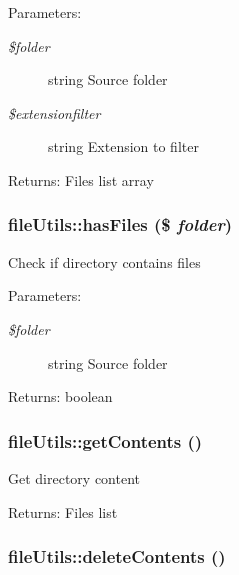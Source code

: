 \begin{Desc}
\item[Parameters:]
\begin{description}
\item[{\em \$folder}]string Source folder \item[{\em \$extensionfilter}]string Extension to filter \end{description}
\end{Desc}
\begin{Desc}
\item[Returns:]Files list array \end{Desc}
\hypertarget{classfileUtils_6d22de4c9ff642da646509c79232208e}{
\subsubsection[hasFiles]{\setlength{\rightskip}{0pt plus 5cm}fileUtils::hasFiles (\$ {\em folder})}}
\label{classfileUtils_6d22de4c9ff642da646509c79232208e}


Check if directory contains files

\begin{Desc}
\item[Parameters:]
\begin{description}
\item[{\em \$folder}]string Source folder \end{description}
\end{Desc}
\begin{Desc}
\item[Returns:]boolean \end{Desc}
\hypertarget{classfileUtils_eb910d3f6118e783640da6491846371a}{
\subsubsection[getContents]{\setlength{\rightskip}{0pt plus 5cm}fileUtils::getContents ()}}
\label{classfileUtils_eb910d3f6118e783640da6491846371a}


Get directory content

\begin{Desc}
\item[Returns:]Files list \end{Desc}
\hypertarget{classfileUtils_ac8851b20fce480f539ce45dc47b5267}{
\subsubsection[deleteContents]{\setlength{\rightskip}{0pt plus 5cm}fileUtils::deleteContents ()}}
\label{classfileUtils_ac8851b20fce480f539ce45dc47b5267}


